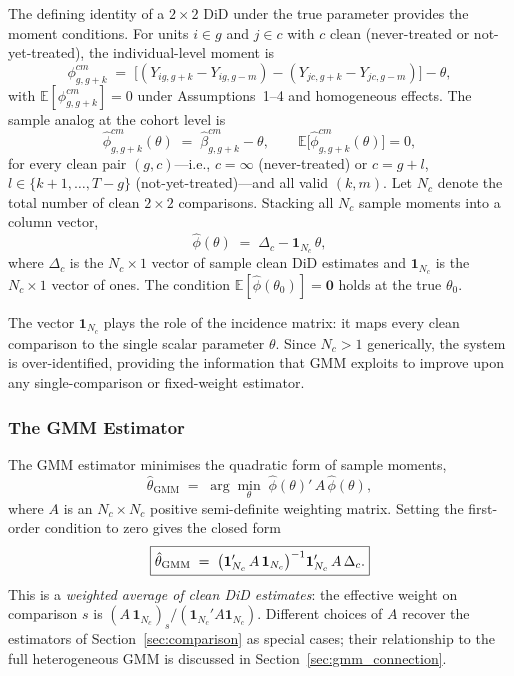 \documentclass[12pt,letterpaper]{article}
\theoremstyle{remark}
\theoremstyle{definition}
\newcommand{\E}{\mathbb{E}}
\newcommand{\hbeta}{\hat{\beta}}
\begin{document}
The defining identity of a $2\times2$ DiD under the true parameter provides
the moment conditions. For units $i\in g$ and $j\in c$ with $c$ clean
(never-treated or not-yet-treated), the individual-level moment is
\begin{equation}
  \phi^{cm}_{g,g+k}
  \;=\;
  \bigl[(Y_{ig,g+k}-Y_{ig,g-m})-(Y_{jc,g+k}-Y_{jc,g-m})\bigr]
  -\theta,
  \label{eq:moment_indiv}
\end{equation}
with $\E[\phi^{cm}_{g,g+k}]=0$ under Assumptions~1--4 and homogeneous
effects. The sample analog at the cohort level is
\begin{equation}
  \hat{\phi}^{cm}_{g,g+k}(\theta)
  \;=\;
  \hbeta^{cm}_{g,g+k} - \theta,
  \qquad
  \E\bigl[\hat{\phi}^{cm}_{g,g+k}(\theta)\bigr] = 0,
  \label{eq:moment}
\end{equation}
for every clean pair $(g,c)$---i.e., $c=\infty$ (never-treated) or
$c=g+l$, $l\in\{k+1,\ldots,T-g\}$ (not-yet-treated)---and all valid
$(k,m)$. Let $N_c$ denote the total number of clean $2\times2$
comparisons. Stacking all $N_c$ sample moments into a column vector,
\begin{equation}
  \hat{\phi}(\theta)
  \;=\;
  \Delta_c - \mathbf{1}_{N_c}\,\theta,
  \label{eq:stacked}
\end{equation}
where $\Delta_c$ is the $N_c\times1$ vector of sample clean DiD estimates
and $\mathbf{1}_{N_c}$ is the $N_c\times1$ vector of ones. The condition
$\E[\hat{\phi}(\theta_0)]=\mathbf{0}$ holds at the true $\theta_0$.

The vector $\mathbf{1}_{N_c}$ plays the role of the incidence matrix: it
maps every clean comparison to the single scalar parameter $\theta$. Since
$N_c>1$ generically, the system is over-identified, providing the
information that GMM exploits to improve upon any single-comparison
or fixed-weight estimator.

\subsubsection{The GMM Estimator}
\label{sec:gmm_estimator}

The GMM estimator minimises the quadratic form of sample moments,
\begin{equation}
  \hat{\theta}_{\mathrm{GMM}}
  \;=\;
  \arg\min_{\theta}\;
  \hat{\phi}(\theta)'\,A\,\hat{\phi}(\theta),
  \label{eq:gmm_obj}
\end{equation}
where $A$ is an $N_c\times N_c$ positive semi-definite weighting matrix.
Setting the first-order condition to zero gives the closed form
\begin{equation}
  \boxed{%
    \hat{\theta}_{\mathrm{GMM}}
    \;=\;
    \bigl(\mathbf{1}_{N_c}'\,A\,\mathbf{1}_{N_c}\bigr)^{-1}
    \mathbf{1}_{N_c}'\,A\,\Delta_c.
  }
  \label{eq:gmm}
\end{equation}
This is a \emph{weighted average of clean DiD estimates}: the effective weight
on comparison $s$ is $(A\,\mathbf{1}_{N_c})_s / (\mathbf{1}_{N_c}'A\mathbf{1}_{N_c})$.
Different choices of $A$ recover the estimators of
Section~\ref{sec:comparison} as special cases; their relationship to the
full heterogeneous GMM is discussed in Section~\ref{sec:gmm_connection}.
\end{document}
